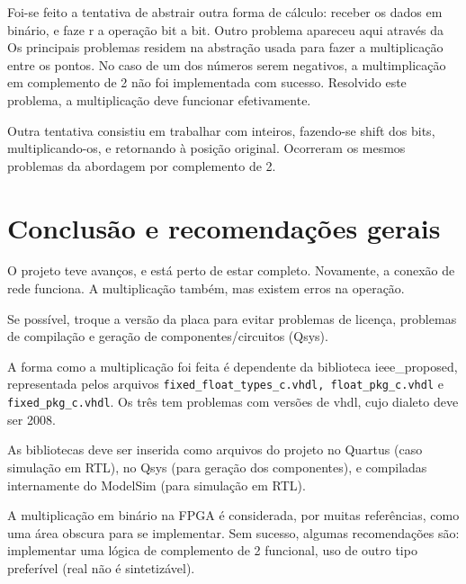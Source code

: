 \documentclass [12pt,oneside] {article}
\begin{document}
	Foi-se feito a tentativa de abstrair outra forma de cálculo:
receber os dados em binário, e faze r a operação bit a bit. Outro
problema apareceu aqui através da  Os principais problemas residem na
abstração usada para fazer a multiplicação entre os pontos. No caso de
um dos números serem negativos, a multimplicação em complemento de 2
não foi implementada com sucesso. Resolvido este problema, a
multiplicação deve funcionar efetivamente.

	Outra tentativa consistiu em trabalhar com inteiros,
fazendo-se shift dos bits, multiplicando-os, e retornando à posição
original. Ocorreram os mesmos problemas da abordagem por complemento
de 2.

\newpage
\section{Conclusão e recomendações gerais}

	O projeto teve avanços, e está perto de estar completo.
Novamente, a conexão de rede funciona. A multiplicação também, mas existem erros na
operação.

	Se possível, troque a versão da placa para evitar problemas de
licença, problemas de compilação e geração de componentes/circuitos
(Qsys).

	A forma como a multiplicação foi feita é dependente da
biblioteca ieee\_proposed, representada pelos arquivos
\texttt{fixed\_float\_types\_c.vhdl, float\_pkg\_c.vhdl} e
\texttt{fixed\_pkg\_c.vhdl}. Os três
tem problemas com versões de vhdl, cujo dialeto deve ser 2008.

	As bibliotecas deve ser inserida como arquivos do projeto no
Quartus (caso simulação em RTL), no Qsys (para geração dos
componentes), e compiladas internamente do ModelSim (para simulação em
RTL).

	A multiplicação em binário na FPGA é considerada, por muitas
referências, como uma área obscura para se implementar. Sem sucesso,
algumas recomendações são: implementar uma lógica de complemento de 2
funcional, uso de outro tipo preferível (real não é sintetizável).
\end{document}
